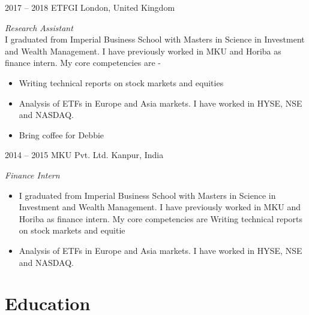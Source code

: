\documentclass[10pt]{friggeri-cv}
\begin{document}
\begin{entrylist}

  \entry
    {2017 -- 2018}
    {ETFGI}
    {London, United Kingdom}
    {\emph{ Research Assistant }\\  I graduated from Imperial Business School with Masters in Science in Investment and Wealth Management. I have previously worked in MKU and Horiba as finance intern. My core competencies are -   \begin{itemize}  	\item Writing technical reports on stock markets and equities  	\item Analysis of ETFs in Europe and Asia markets. I have worked in HYSE, NSE and NASDAQ.  	\item Bring coffee for Debbie  \end{itemize} }
 
  \entry
    {2014 -- 2015}
    {MKU Pvt. Ltd.}
    {Kanpur, India}
    {\emph{ Finance Intern }\\ \begin{itemize}  	\item  	 I graduated from Imperial Business School with Masters in Science in Investment and Wealth Management. I have previously worked in MKU and Horiba as finance intern. My core competencies are Writing technical reports on stock markets and equitie  	  	\item Analysis of ETFs in Europe and Asia markets. I have worked in HYSE, NSE and NASDAQ.  \end{itemize} }
 
\end{entrylist}

\section{Education}
\end{document}

